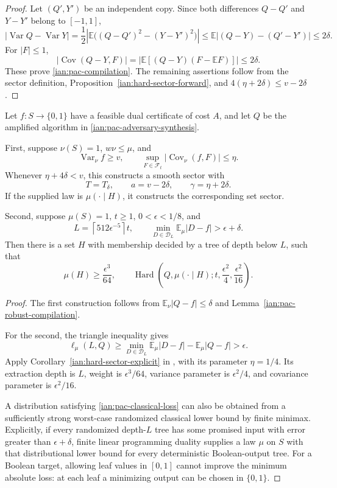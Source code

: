 \begin{proof}
Let \((Q',Y')\) be an independent copy. Since both differences
\(Q-Q'\) and \(Y-Y'\) belong to \([-1,1]\),
\[
 \left|\operatorname{Var}Q-\operatorname{Var}Y\right|
 =\frac12\left|
      \mathbb E\bigl((Q-Q')^2-(Y-Y')^2\bigr)\right|
 \le\mathbb E|(Q-Y)-(Q'-Y')|\le2\delta.
\]
For \(|F|\le1\),
\[
 |\operatorname{Cov}(Q-Y,F)|
   =|\mathbb E[(Q-Y)(F-\mathbb EF)]|
   \le2\delta.
\]
These prove \eqref{ian:pac-compilation}.
The remaining assertions follow from the sector definition,
Proposition~\ref{ian:hard-sector-forward}, and
\(4(\eta+2\delta)\le v-2\delta\).
\end{proof}

\begin{theorem}
\label{ian:pac-adversary-to-sector}
Let \(f:S\to\{0,1\}\) have a feasible dual certificate of cost
\(A\), and let \(Q\) be the amplified algorithm in
\eqref{ian:pac-adversary-synthesis}.

First, suppose \(\nu(S)=1\), \(w\nu\le\mu\), and
\[
 \operatorname{Var}_\nu f\ge v,\qquad
 \sup_{F\in\mathcal F_t}
       |\operatorname{Cov}_\nu(f,F)|\le\eta.
\]
Whenever \(\eta+4\delta<v\), this constructs a smooth sector
with
\[
 T=T_\delta,\qquad
 a=v-2\delta,\qquad
 \gamma=\eta+2\delta.
\]
If the supplied law is \(\mu(\cdot\mid H)\), it constructs the
corresponding set sector.

Second, suppose \(\mu(S)=1\), \(t\ge1\),
\(0<\epsilon<1/8\), and
\[
 L=\left\lceil512\epsilon^{-5}\right\rceil t,\qquad
 \min_{D\in\mathcal D_L}\mathbb E_\mu|D-f|>\epsilon+\delta.
 \tag{32.14}\label{ian:pac-classical-loss}
\]
Then there is a set \(H\) with membership decided by a tree of
depth below \(L\), such that
\[
 \mu(H)\ge\frac{\epsilon^3}{64},\qquad
 \operatorname{Hard}\left(
 Q,\mu(\cdot\mid H);
 t,\frac{\epsilon^2}{4},\frac{\epsilon^2}{16}
 \right).
 \tag{32.15}
\]
\end{theorem}

\begin{proof}
The first construction follows from
\(\mathbb E_\nu|Q-f|\le\delta\) and
Lemma~\ref{ian:pac-robust-compilation}.

For the second, the triangle inequality gives
\[
 \ell_\mu(L,Q)
 \ge\min_{D\in\mathcal D_L}\mathbb E_\mu|D-f|
       -\mathbb E_\mu|Q-f|>\epsilon.
\]
Apply Corollary~\ref{ian:hard-sector-explicit} in
,
with its parameter \(\eta=1/4\).
Its extraction depth is \(L\), weight is
\(\epsilon^3/64\), variance parameter is \(\epsilon^2/4\),
and covariance parameter is \(\epsilon^2/16\).

A distribution satisfying \eqref{ian:pac-classical-loss} can also
be obtained from a sufficiently strong worst-case randomized
classical lower bound by finite minimax. Explicitly, if every
randomized depth-\(L\) tree has some promised input with error
greater than \(\epsilon+\delta\), finite linear programming
duality supplies a law \(\mu\) on \(S\) with that distributional
lower bound for every deterministic Boolean-output tree.
For a Boolean target, allowing leaf values in \([0,1]\) cannot
improve the minimum absolute loss: at each leaf a minimizing
output can be chosen in \(\{0,1\}\).
\end{proof}

